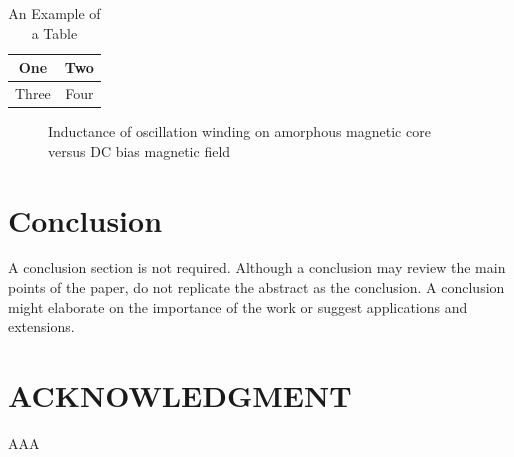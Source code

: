 \documentclass[letterpaper, 10 pt, conference]{ieeeconf}
\begin{document}
\begin{table}[h]
\caption{An Example of a Table}
\label{table_example}
\begin{center}
\begin{tabular}{|c||c|}
\hline
One & Two\\
\hline
Three & Four\\
\hline
\end{tabular}
\end{center}
\end{table}

   \begin{figure}[thpb]
      \centering
      \caption{Inductance of oscillation winding on amorphous
       magnetic core versus DC bias magnetic field}
      \label{figurelabel}
   \end{figure}
   
\section{Conclusion}

A conclusion section is not required. Although a conclusion may review the main points of the paper, do not replicate the abstract as the conclusion. A conclusion might elaborate on the importance of the work or suggest applications and extensions. 

\addtolength{\textheight}{-12cm}  

\section*{ACKNOWLEDGMENT}
AAA
\end{document}
